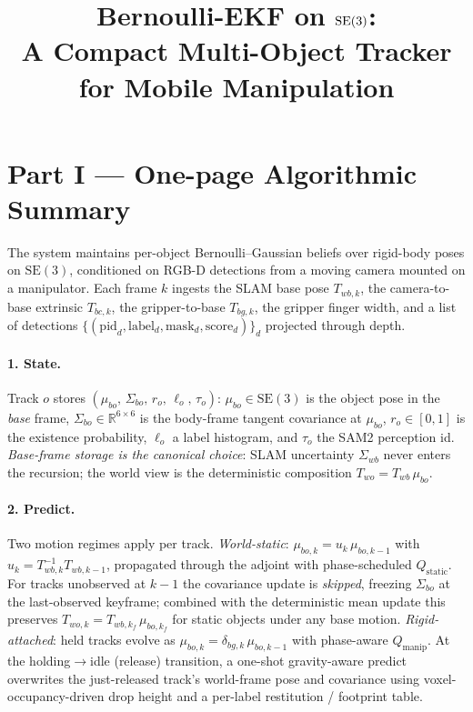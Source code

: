 \documentclass[11pt]{article}
\title{Bernoulli-EKF on $\SE$:\\
  A Compact Multi-Object Tracker for Mobile Manipulation}
\author{}
\date{}
\newcommand{\R}{\mathbb{R}}
\newcommand{\SE}{\mathrm{SE}(3)}
\begin{document}
\maketitle

\section*{Part I --- One-page Algorithmic Summary}
\label{sec:summary}

The system maintains per-object Bernoulli--Gaussian beliefs over rigid-body
poses on $\SE$, conditioned on RGB-D detections from a moving camera mounted
on a manipulator. Each frame $k$ ingests the SLAM base pose $T_{wb,k}$, the
camera-to-base extrinsic $T_{bc,k}$, the gripper-to-base $T_{bg,k}$, the
gripper finger width, and a list of detections
$\{(\mathrm{pid}_d,\mathrm{label}_d,\mathrm{mask}_d,\mathrm{score}_d)\}_d$
projected through depth.

\paragraph{1. State.} Track $o$ stores
$(\mu_{bo},\,\Sigma_{bo},\,r_o,\,\ell_o,\,\tau_o)$:
$\mu_{bo}\in\SE$ is the object pose in the \emph{base} frame, $\Sigma_{bo}\in
\R^{6\times 6}$ is the body-frame tangent covariance at $\mu_{bo}$, $r_o\in
[0,1]$ is the existence probability, $\ell_o$ a label histogram, and
$\tau_o$ the SAM2 perception id. \emph{Base-frame storage is the canonical
choice}: SLAM uncertainty $\Sigma_{wb}$ never enters the recursion; the world
view is the deterministic composition $T_{wo}=T_{wb}\,\mu_{bo}$.

\paragraph{2. Predict.} Two motion regimes apply per track. \emph{World-static}:
$\mu_{bo,k}=u_k\,\mu_{bo,k-1}$ with $u_k=T_{wb,k}^{-1}T_{wb,k-1}$, propagated
through the adjoint with phase-scheduled $Q_{\text{static}}$. For tracks
unobserved at $k{-}1$ the covariance update is \emph{skipped}, freezing
$\Sigma_{bo}$ at the last-observed keyframe; combined with the deterministic
mean update this preserves $T_{wo,k}=T_{wb,k_f}\,\mu_{bo,k_f}$ for static
objects under any base motion. \emph{Rigid-attached}: held tracks evolve as
$\mu_{bo,k}=\delta_{bg,k}\,\mu_{bo,k-1}$ with phase-aware $Q_{\text{manip}}$.
At the holding$\to$idle (release) transition, a one-shot gravity-aware predict
overwrites the just-released track's world-frame pose and covariance using
voxel-occupancy-driven drop height and a per-label restitution / footprint
table.
\end{document}
